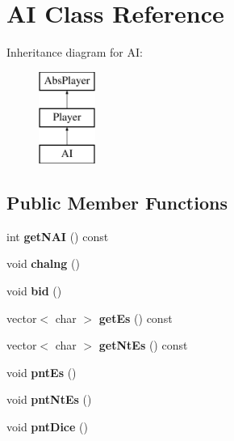 \hypertarget{class_a_i}{}\section{A\+I Class Reference}
\label{class_a_i}
Inheritance diagram for A\+I\+:\begin{figure}[H]
\begin{center}
\leavevmode
\includegraphics[height=3.000000cm]{class_a_i}
\end{center}
\end{figure}
\subsection*{Public Member Functions}
\begin{DoxyCompactItemize}
\item 
\hypertarget{class_a_i_afe998e179e8c6afd5a2248ecaf38c02b}{}int {\bfseries get\+N\+A\+I} () const \label{class_a_i_afe998e179e8c6afd5a2248ecaf38c02b}

\item 
\hypertarget{class_a_i_a4628bc4637346efb2d55e48a8bfda296}{}void {\bfseries chalng} ()\label{class_a_i_a4628bc4637346efb2d55e48a8bfda296}

\item 
\hypertarget{class_a_i_ae14682d2801991ed6d638aefa3716d20}{}void {\bfseries bid} ()\label{class_a_i_ae14682d2801991ed6d638aefa3716d20}

\item 
\hypertarget{class_a_i_aeedc12d65a7a5fc7123182e0ab5afcd8}{}vector$<$ char $>$ {\bfseries get\+Es} () const \label{class_a_i_aeedc12d65a7a5fc7123182e0ab5afcd8}

\item 
\hypertarget{class_a_i_a6f30532a9fda54bfb1888a9b7e73b8ef}{}vector$<$ char $>$ {\bfseries get\+Nt\+Es} () const \label{class_a_i_a6f30532a9fda54bfb1888a9b7e73b8ef}

\item 
\hypertarget{class_a_i_a252bf235b42811ba6d544723ed2a1686}{}void {\bfseries pnt\+Es} ()\label{class_a_i_a252bf235b42811ba6d544723ed2a1686}

\item 
\hypertarget{class_a_i_ab1c0dff3c1df8b4908930e44145f10f1}{}void {\bfseries pnt\+Nt\+Es} ()\label{class_a_i_ab1c0dff3c1df8b4908930e44145f10f1}

\item 
\hypertarget{class_a_i_aa27ec709f651ee081b23e033b27c8dce}{}void {\bfseries pnt\+Dice} ()\label{class_a_i_aa27ec709f651ee081b23e033b27c8dce}

\end{DoxyCompactItemize}
